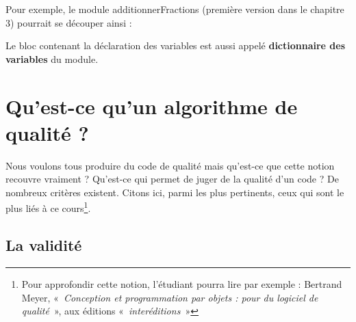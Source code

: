 	{
	Pour exemple, le module additionnerFractions (première version dans le
	chapitre 3) pourrait se découper ainsi :}






	{
	{Le bloc contenant la déclaration des variables
	est aussi appelé }{\textbf{dictionnaire des
	variables}}{ du module.}}

\section{Qu'est-ce qu'un algorithme de qualité ?}

	{
	Nous voulons tous produire du code de qualité mais
	qu'est-ce que cette notion recouvre vraiment ?
	Qu'est-ce qui permet de juger de la qualité
	d'un code ? De nombreux critères existent. Citons ici,
	parmi les plus pertinents, ceux qui sont le plus liés à ce
	cours\footnote{Pour approfondir cette notion,
	l'étudiant pourra lire par exemple : Bertrand Meyer,
	«~\textit{Conception et programmation par objets : pour du logiciel de
	qualité}~», aux éditions «\textit{~interéditions~}»}. }

\subsection{La validité}

